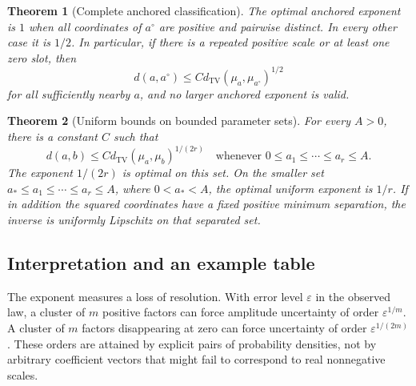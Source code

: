 \documentclass[11pt,a4paper]{article}
\numberwithin{equation}{section}
\newtheorem{theorem}{Theorem}[section]
\theoremstyle{definition}
\theoremstyle{remark}
\newcommand{\TV}{d_{\mathrm{TV}}}
\newcommand{\base}{a^{\circ}}
\begin{document}
\begin{theorem}[Complete anchored classification]
\label{thm:anchored}
The optimal anchored exponent is $1$ when all coordinates of $\base$ are positive
and pairwise distinct.  In every other case it is $1/2$.  In particular, if there
is a repeated positive scale or at least one zero slot, then
\begin{equation}
 d(a,\base)\le C\TV(\mu_a,\mu_{\base})^{1/2}
 \label{eq:anchored}
\end{equation}
for all sufficiently nearby $a$, and no larger anchored exponent is valid.
\end{theorem}

\begin{theorem}[Uniform bounds on bounded parameter sets]
\label{thm:global}
For every $A>0$, there is a constant $C$ such that
\begin{equation}
 d(a,b)\le C\TV(\mu_a,\mu_b)^{1/(2r)}
 \quad\text{whenever }0\le a_1\le\cdots\le a_r\le A.
 \label{eq:global}
\end{equation}
The exponent $1/(2r)$ is optimal on this set.  On the smaller set
$a_*\le a_1\le\cdots\le a_r\le A$, where $0<a_*<A$, the optimal uniform exponent
is $1/r$.  If in addition the squared coordinates have a fixed positive minimum
separation, the inverse is uniformly Lipschitz on that separated set.
\end{theorem}

\subsection{Interpretation and an example table}
The exponent measures a loss of resolution.  With error level $\varepsilon$ in
the observed law, a cluster of $m$ positive factors can force amplitude uncertainty
of order $\varepsilon^{1/m}$.  A cluster of $m$ factors disappearing at zero can
force uncertainty of order $\varepsilon^{1/(2m)}$.  These orders are attained by
explicit pairs of probability densities, not by arbitrary coefficient vectors
that might fail to correspond to real nonnegative scales.
\end{document}

